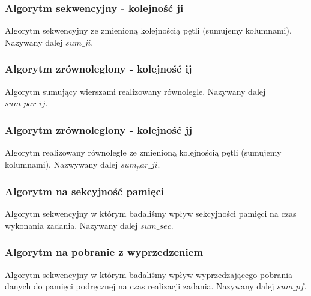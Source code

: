 \subsubsection{Algorytm sekwencyjny - kolejność ji}

Algorytm sekwencyjny ze zmienioną kolejnością pętli (sumujemy kolumnami). Nazywany dalej $sum\_ji$.



\subsubsection{Algorytm zrównoleglony - kolejność ij}

Algorytm sumujący wierszami realizowany równolegle. Nazywany dalej $sum\_par\_ij$.



\subsubsection{Algorytm zrównoleglony - kolejność jj}

Algorytm realizowany równolegle ze zmienioną kolejnością pętli (sumujemy kolumnami). Nazwywany dalej $sum_par\_ji$.



\subsubsection{Algorytm na sekcyjność pamięci}

Algorytm sekwencyjny w którym badaliśmy wpływ sekcyjności pamięci na czas wykonania zadania. Nazywany dalej $sum\_sec$.



\subsubsection{Algorytm na  pobranie  z wyprzedzeniem}

Algorytm sekwencyjny w którym badaliśmy wpływ wyprzedzającego pobrania danych do pamięci podręcznej na czas realizacji zadania. Nazywany dalej $sum\_pf$.


